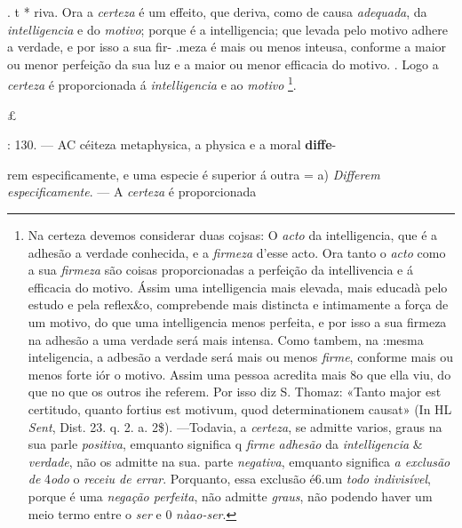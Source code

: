 . t *   riva. Ora a \emph{certeza} é um effeito, que deriva, como de causa \emph{adequada}, da \emph{intelligencia} e do \emph{motivo}; porque é a intelligencia; que levada pelo motivo adhere a verdade, e por isso a sua fir- .meza é mais ou menos inteusa, conforme a maior ou menor perfeição da sua luz e a maior ou menor efficacia do motivo. . Logo a \emph{certeza} é proporcionada á \emph{intelligencia} e ao \emph{motivo} \footnote{Na certeza devemos considerar duas cojsas: O \emph{acto} da intelligencia, que é a adhesão a verdade conhecida, e a \emph{firmeza} d'esse acto. Ora tanto o \emph{acto} como a sua \emph{firmeza} são coisas proporcionadas a perfeição da intellivencia e á efficacia do motivo. Ássim uma intelligencia mais elevada, mais educadà pelo estudo e pela reflex\&o, comprebende mais distincta e intimamente a força de um motivo, do que uma intelligencia menos perfeita, e por isso a sua firmeza na adhesão a uma verdade será mais intensa. Como tambem, na :mesma inteligencia, a adbesão a verdade será mais ou menos \emph{firme}, conforme mais ou menos forte iór o motivo. Assim uma pessoa acredita mais 8o que ella viu, do que no que os outros ihe referem. Por isso diz S. Thomaz: «Tanto major est certitudo, quanto fortius est motivum, quod determinationem causat» (In HL \emph{Sent}, Dist. 23. q. 2. a. 2\$). ---Todavia, a \emph{certeza}, se admitte varios, graus na sua parle \emph{positiva}, emquanto significa q \emph{firme adhesão} da \emph{intelligencia} \& \emph{verdade}, não os admitte na sua. parte \emph{negativa}, emquanto significa \emph{a exclusão de} 4\emph{odo} o \emph{receiu de errar}. Porquanto, essa exclusão é6.um \emph{todo indivisível}, porque é uma \emph{negação perfeita}, não admitte \emph{graus}, não podendo haver um meio termo entre o \emph{ser} e 0 \emph{nàao-ser}.}.

£

: 130. --- AC céiteza metaphysica, a physica e a moral \textbf{diffe}-

rem especificamente, e uma especie é superior á outra = a) \emph{Differem especificamente}. --- A \emph{certeza} é proporcionada

